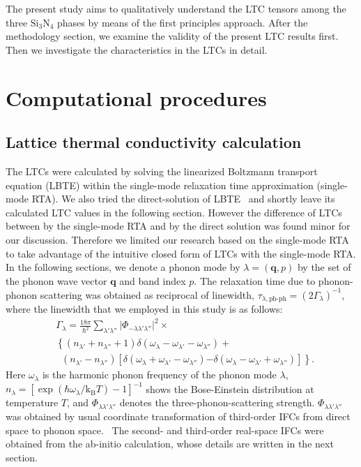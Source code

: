 \documentclass[twocolumn,amsmath,amssymb,a4paper,prb,superscriptaddress,floatfix]{revtex4-1}
\begin{document}
The present study aims to qualitatively understand the LTC tensors among the
three Si$_3$N$_4$ phases by means of the first principles approach.  After the
methodology section, we examine the validity of the present LTC results first.
Then we investigate the characteristics in the LTCs in detail.

\section{Computational procedures}
\subsection{Lattice thermal conductivity calculation}
The LTCs were calculated by solving the linearized Boltzmann transport equation
(LBTE) within the single-mode relaxation time approximation (single-mode RTA).
We also tried the direct-solution of LBTE~\cite{chaput-direct} and shortly
leave its calculated LTC values in the following section. However the
difference of LTCs between by the single-mode RTA and by the direct solution
was found minor for our discussion.  Therefore we limited our research based on
the single-mode RTA to take advantage of the intuitive closed form of LTCs with
the single-mode RTA.  In the following sections, we denote a phonon mode by
$\lambda=(\mathbf{q},p)$ by the set of the phonon wave vector $\mathbf{q}$ and
band index $p$. The relaxation time due to phonon-phonon scattering was
obtained as reciprocal of linewidth,
$\tau_{\lambda,\text{ph-ph}}=(2\Gamma_\lambda)^{-1}$, where the linewidth that
we employed in this study is as follows:
\begin{align}
 \label{eq:linewidth}
 &\Gamma_\lambda = \frac{18\pi}{\hbar^2}
  \sum_{\lambda' \lambda''}
  \bigl|\Phi_{-\lambda\lambda'\lambda''}\bigl|^2 \times \nonumber \\ 
 &\left\{ (n_{\lambda'} + n_{\lambda''}+1) 
   \delta(\omega_\lambda-\omega_{\lambda'}-\omega_{\lambda''}) \right.
   + \nonumber \\ 
 &\;\;(n_{\lambda'}-n_{\lambda''})
  \left[\delta(\omega_\lambda +\omega_{\lambda'}-\omega_{\lambda''})
 \right. 
 \left. -\left. \delta(\omega_\lambda - \omega_{\lambda'}+\omega_{\lambda''})
 \right]\right\}.
\end{align}
Here $\omega_\lambda$ is the harmonic phonon frequency of the phonon mode
$\lambda$, $n_\lambda=[\exp(\hbar\omega_\lambda/\mathrm{k_B}T)-1]^{-1}$ shows
the Bose-Einstein distribution at temperature $T$, and
$\Phi_{\lambda\lambda'\lambda''}$ denotes the three-phonon-scattering strength.
$\Phi_{\lambda\lambda'\lambda''}$ was obtained by usual coordinate
transformation of third-order IFCs from direct space to phonon
space.~\cite{phono3py} The second- and third-order real-space IFCs
were obtained from the ab-initio calculation, whose details are written in the
next section.
\end{document}
